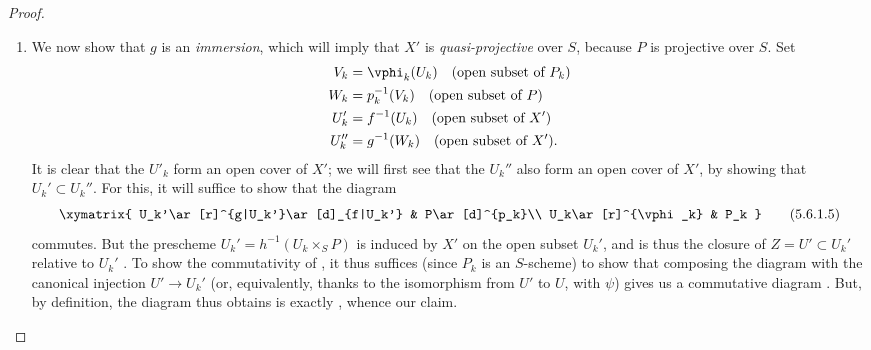 \begin{proof}
\begin{enumerate}
  \item[(D)] We now show that $g$ is an \emph{immersion}, which will imply that $X'$ is \emph{quasi-projective} over $S$, because $P$ is projective over $S$.
    Set
    \begin{align*}
      V_k  &=\vphi_k(U_k) \quad(\text{open subset of }P_k)\\
      W_k  &=p_k^{-1}(V_k)\quad(\text{open subset of }P)\\
      U_k' &=f^{-1}(U_k)  \quad(\text{open subset of }X')\\
      U_k''&=g^{-1}(W_k)  \quad(\text{open subset of }X').
    \end{align*}
    It is clear that the $U'_k$ form an open cover of $X'$; we will first see that the $U_k''$ also form an open cover of $X'$, by showing that $U_k'\subset U_k''$.
    For this, it will suffice to show that the diagram
    \[
    \label{II.5.6.1.5}
      \xymatrix{
        U_k'\ar[r]^{g|U_k'}\ar[d]_{f|U_k'} &
        P\ar[d]^{p_k}\\
        U_k\ar[r]^{\vphi_k} &
        P_k
      }
      \tag{5.6.1.5}
    \]
    commutes.
    But the prescheme $U_k'=h^{-1}(U_k\times_S P)$ is induced by $X'$ on the open subset $U_k'$, and is thus the closure of $Z=U'\subset U_k'$ relative to $U_k'$ .
    To show the commutativity of , it thus suffices (since $P_k$ is an $S$-scheme) to show that composing the diagram with the canonical injection $U'\to U_k'$ (or, equivalently, thanks to the isomorphism from $U'$ to $U$, with $\psi$) gives us a commutative diagram .
    But, by definition, the diagram thus obtains is exactly , whence our claim.


\end{enumerate}
\end{proof}
